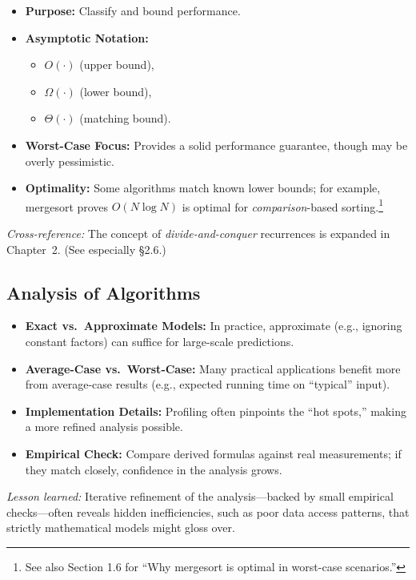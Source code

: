 \documentclass[11pt,letterpaper]{article}
\begin{document}
\begin{itemize}
  \item \textbf{Purpose:} Classify and bound performance.
  \item \textbf{Asymptotic Notation:} 
    \begin{itemize}
      \item \(O(\cdot)\) (upper bound), 
      \item \(\Omega(\cdot)\) (lower bound),
      \item \(\Theta(\cdot)\) (matching bound).
    \end{itemize}
  \item \textbf{Worst-Case Focus:} Provides a solid performance guarantee, though may be overly pessimistic.
  \item \textbf{Optimality:} Some algorithms match known lower bounds; for example, mergesort proves \(O(N \log N)\) is optimal for \emph{comparison}-based sorting.\footnote{See also Section 1.6 for “Why mergesort is optimal in worst-case scenarios.”}
\end{itemize}

\noindent
\emph{Cross-reference:} The concept of \emph{divide-and-conquer} recurrences is expanded in Chapter~2.  (See especially \S2.6.)

\subsection{Analysis of Algorithms}

\begin{itemize}
  \item \textbf{Exact vs.\ Approximate Models:} In practice, approximate (e.g., ignoring constant factors) can suffice for large-scale predictions.
  \item \textbf{Average-Case vs.\ Worst-Case:} Many practical applications benefit more from average-case results (e.g., expected running time on “typical” input).
  \item \textbf{Implementation Details:} Profiling often pinpoints the “hot spots,” making a more refined analysis possible.
  \item \textbf{Empirical Check:} Compare derived formulas against real measurements; if they match closely, confidence in the analysis grows.
\end{itemize}

\noindent
\emph{Lesson learned:} Iterative refinement of the analysis---backed by small empirical checks---often reveals hidden inefficiencies, such as poor data access patterns, that strictly mathematical models might gloss over.
\end{document}
